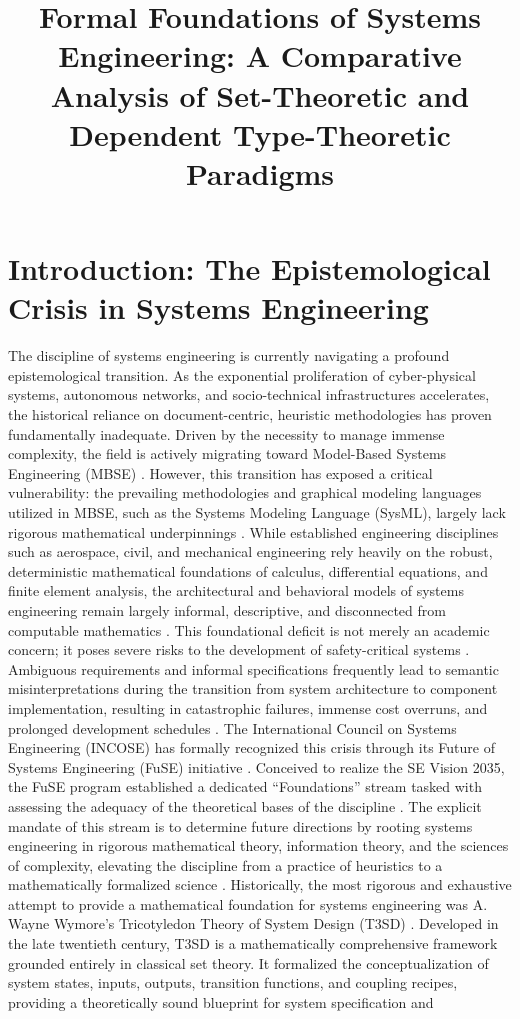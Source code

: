 \documentclass[11pt]{article}
\title{Formal Foundations of Systems Engineering: A Comparative Analysis of Set-Theoretic and Dependent Type-Theoretic Paradigms}
\author{}
\date{}
\begin{document}
\maketitle

\section{Introduction: The Epistemological Crisis in Systems Engineering}

The discipline of systems engineering is currently navigating a profound epistemological transition. As the exponential proliferation of cyber-physical systems, autonomous networks, and socio-technical infrastructures accelerates, the historical reliance on document-centric, heuristic methodologies has proven fundamentally inadequate. Driven by the necessity to manage immense complexity, the field is actively migrating toward Model-Based Systems Engineering (MBSE) \parencite{Ref1, Ref2}. However, this transition has exposed a critical vulnerability: the prevailing methodologies and graphical modeling languages utilized in MBSE, such as the Systems Modeling Language (SysML), largely lack rigorous mathematical underpinnings \parencite{Ref3, Ref4}. While established engineering disciplines such as aerospace, civil, and mechanical engineering rely heavily on the robust, deterministic mathematical foundations of calculus, differential equations, and finite element analysis, the architectural and behavioral models of systems engineering remain largely informal, descriptive, and disconnected from computable mathematics \parencite{Ref3}. This foundational deficit is not merely an academic concern; it poses severe risks to the development of safety-critical systems \parencite{Ref5, Ref6}. Ambiguous requirements and informal specifications frequently lead to semantic misinterpretations during the transition from system architecture to component implementation, resulting in catastrophic failures, immense cost overruns, and prolonged development schedules \parencite{Ref2, Ref7}. The International Council on Systems Engineering (INCOSE) has formally recognized this crisis through its Future of Systems Engineering (FuSE) initiative \parencite{Ref8, Ref9}. Conceived to realize the SE Vision 2035, the FuSE program established a dedicated ``Foundations'' stream tasked with assessing the adequacy of the theoretical bases of the discipline \parencite{Ref8, Ref10}. The explicit mandate of this stream is to determine future directions by rooting systems engineering in rigorous mathematical theory, information theory, and the sciences of complexity, elevating the discipline from a practice of heuristics to a mathematically formalized science \parencite{Ref8, Ref10}. Historically, the most rigorous and exhaustive attempt to provide a mathematical foundation for systems engineering was A. Wayne Wymore's Tricotyledon Theory of System Design (T3SD) \parencite{Ref11, Ref12}. Developed in the late twentieth century, T3SD is a mathematically comprehensive framework grounded entirely in classical set theory. It formalized the conceptualization of system states, inputs, outputs, transition functions, and coupling recipes, providing a theoretically sound blueprint for system specification and 
\end{document}
